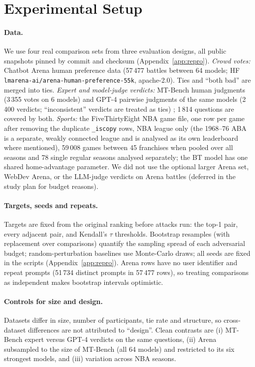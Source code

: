 \documentclass{article}
\begin{document}
\section{Experimental Setup}\label{sec:setup}
\paragraph{Data.}
We use four real comparison sets from three evaluation designs, all public snapshots pinned by commit and checksum (Appendix~\ref{app:repro}).
\emph{Crowd votes:} Chatbot Arena human preference data (57\,477 battles between 64 models; HF \texttt{lmarena-ai/arena-human-preference-55k}, apache-2.0). Ties and ``both bad'' are merged into ties.
\emph{Expert and model-judge verdicts:} MT-Bench human judgments (3\,355 votes on 6 models) and GPT-4 pairwise judgments of the same models (2\,400 verdicts; ``inconsistent'' verdicts are treated as ties) \citep{zheng2023judge}; 1\,814 questions are covered by both.
\emph{Sports:} the FiveThirtyEight NBA game file, one row per game after removing the duplicate \texttt{\_iscopy} rows, NBA league only (the 1968--76 ABA is a separate, weakly connected league and is analysed as its own leaderboard where mentioned), 59\,008 games between 45 franchises when pooled over all seasons and 78 single regular seasons analysed separately; the BT model has one shared home-advantage parameter.
We did not use the optional larger Arena set, WebDev Arena, or the LLM-judge verdicts on Arena battles (deferred in the study plan for budget reasons).
\paragraph{Targets, seeds and repeats.}
Targets are fixed from the original ranking before attacks run: the top-1 pair, every adjacent pair, and Kendall's $\tau$ thresholds.
Bootstrap resamples (with replacement over comparisons) quantify the sampling spread of each adversarial budget; random-perturbation baselines use Monte-Carlo draws; all seeds are fixed in the scripts (Appendix~\ref{app:repro}).
Arena rows have no user identifier and repeat prompts (51\,734 distinct prompts in 57\,477 rows), so treating comparisons as independent makes bootstrap intervals optimistic.
\paragraph{Controls for size and design.}
Datasets differ in size, number of participants, tie rate and structure, so cross-dataset differences are not attributed to ``design''.
Clean contrasts are (i) MT-Bench expert versus GPT-4 verdicts on the same questions, (ii) Arena subsampled to the size of MT-Bench (all 64 models) and restricted to its six strongest models, and (iii) variation across NBA seasons.
\end{document}
